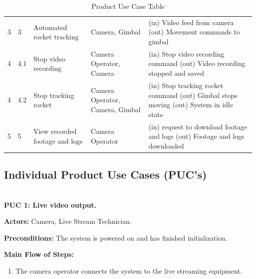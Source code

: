 \documentclass[12pt]{article}
\begin{document}
\begin{table}[H]
\begin{tabularx}{\textwidth}{p{0.4in}p{0.4in}p{1.25in}p{1in}X}
    3                               & 3                       & Automated rocket tracking      &
    Camera, Gimbal                  &
    (in) Video feed from camera \newline
    (out) Movement commands to gimbal                                                            \\
    4                               & 4.1                     & Stop video recording           &
    Camera Operator, Camera         &
    (in) Stop video recording command \newline
    (out) Video recording stopped and saved                                                      \\
    4                               & 4.2                     & Stop tracking rocket           &
    Camera Operator, Camera, Gimbal &
    (in) Stop tracking rocket command \newline
    (out) Gimbal stops moving \newline
    (out) System in idle state                                                                   \\
    5                               & 5                       & View recorded footage and logs &
    Camera Operator                 &
    (in) request to download footage and logs \newline
    (out) Footage and logs downloaded                                                            \\

    \bottomrule
  \end{tabularx}
  \caption{Product Use Case Table}
  \label{tab:product-use-case-table}
\end{table}

\subsection{Individual Product Use Cases (PUC's)}

~\\

\textbf{PUC 1: Live video output.}

\textbf{Actors:} Camera, Live Stream Technician.

\textbf{Preconditions:} The system is powered on and has finished initialization.

\textbf{Main Flow of Steps:}
\begin{enumerate}
  \item The camera operator connects the system to the live streaming equipment.
\end{enumerate}
\end{document}
